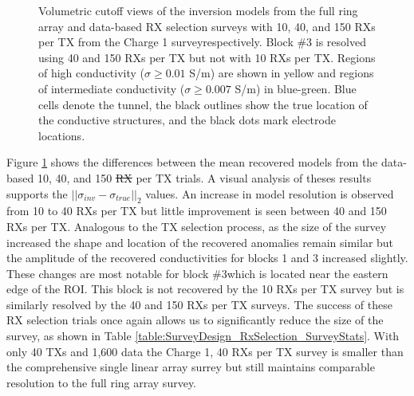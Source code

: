 \documentclass[preprint,authoryear,12pt]{elsarticle}
\providecommand{\DIFaddtex}[1]{{\protect\color{blue}\uwave{#1}}} %
\providecommand{\DIFdeltex}[1]{{\protect\color{red}\sout{#1}}}                      %
\providecommand{\DIFaddbegin}{} %
\providecommand{\DIFaddend}{} %
\providecommand{\DIFdelbegin}{} %
\providecommand{\DIFdelend}{} %
\providecommand{\DIFaddFL}[1]{\DIFadd{#1}} %
\providecommand{\DIFaddbeginFL}{} %
\providecommand{\DIFaddendFL}{} %
\providecommand{\DIFadd}[1]{\texorpdfstring{\DIFaddtex{#1}}{#1}} %
\providecommand{\DIFdel}[1]{\texorpdfstring{\DIFdeltex{#1}}{}} %
\begin{document}
\begin{figure}[htp]{}
\begin{center}
   \end{center}
\vspace{-0.4cm}
\caption{Volumetric cutoff views of the inversion models from the full ring array and data-based RX selection surveys with 10, 40, and 150 RXs per TX from the Charge 1 survey\DIFaddbeginFL \DIFaddFL{, }\DIFaddendFL respectively. Block \#3 is resolved using 40 and 150 RXs per TX but not with 10 RXs per TX. Regions of high conductivity ($\sigma \geq 0.01$ S/m) are shown in yellow and regions of intermediate conductivity ($\sigma \geq 0.007$ S/m) in blue-green. Blue cells denote the tunnel, the black outlines show the true location of the conductive structures, and the black dots mark electrode locations.}
\label{fig:InvMod_SurveyDesign_MultiBlk_Isosurfaces_Charge1_RxSelection}
\end{figure}


Figure \ref{fig:InvMod_SurveyDesign_MultiBlk_Isosurfaces_Charge1_RxSelection} shows the differences between the mean recovered models from the data-based 10, 40, and 150 \DIFdelbegin \DIFdel{RX }\DIFdelend \DIFaddbegin \DIFadd{RXs }\DIFaddend per TX trials. A visual analysis of theses results supports the $\left|| \sigma_{inv} - \sigma_{true} \right||_2$ values. An increase in model resolution is observed from 10 to 40 RXs per TX but little improvement is seen between 40 and 150 RXs per TX. Analogous to the TX selection process, as the size of the survey increased the shape and location of the recovered anomalies remain similar but the amplitude of the recovered conductivities for blocks 1 and 3 increased slightly. These changes are most notable for block \#3\DIFaddbegin \DIFadd{, }\DIFaddend which is located near the eastern edge of the ROI. This block is not recovered by the 10 RXs per TX survey but is similarly resolved by the 40 and 150 RXs per TX surveys. The success of these RX selection trials once again allows us to significantly reduce the size of the survey, as shown in Table \ref{table:SurveyDesign_RxSelection_SurveyStats}. With only 40 TXs and 1,600 data the Charge 1, 40 RXs per TX survey is smaller than the comprehensive single linear array surrey but still maintains comparable resolution to the full ring array survey.
\end{document}
